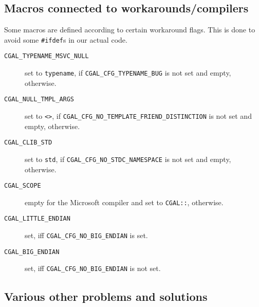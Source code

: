 \subsection{Macros connected to workarounds/compilers}
\label{sec:workaround_macros}

Some macros are defined according to certain workaround flags. This is
done to avoid some \texttt{\#ifdef}s in our actual code.

\begin{description}
\item[\texttt{CGAL\_TYPENAME\_MSVC\_NULL}] set to \texttt{typename},
  if {\texttt{CGAL\_CFG\_TYPENAME\_BUG}} is not set and
  empty, otherwise.
\item[\texttt{CGAL\_NULL\_TMPL\_ARGS}] set to \texttt{<>}, if
  {\texttt{CGAL\_CFG\_NO\_TEMPLATE\_FRIEND\_DISTINCTION}}
  is not set and empty, otherwise.
\item[\texttt{CGAL\_CLIB\_STD}] 
  set to \texttt{std}, if
  {\texttt{CGAL\_CFG\_NO\_STDC\_NAMESPACE}} is not set and
  empty, otherwise.
\item[\texttt{CGAL\_SCOPE}] 
  empty for the Microsoft compiler and set
  to \texttt{CGAL::}, otherwise.
\item[\texttt{CGAL\_LITTLE\_ENDIAN}] set, iff
  {\texttt{CGAL\_CFG\_NO\_BIG\_ENDIAN}} is set.
\item[\texttt{CGAL\_BIG\_ENDIAN}] set, iff
  {\texttt{CGAL\_CFG\_NO\_BIG\_ENDIAN}} is not set.
\end{description}


\subsection{Various other problems and solutions}
\label{sec:various_problems}


